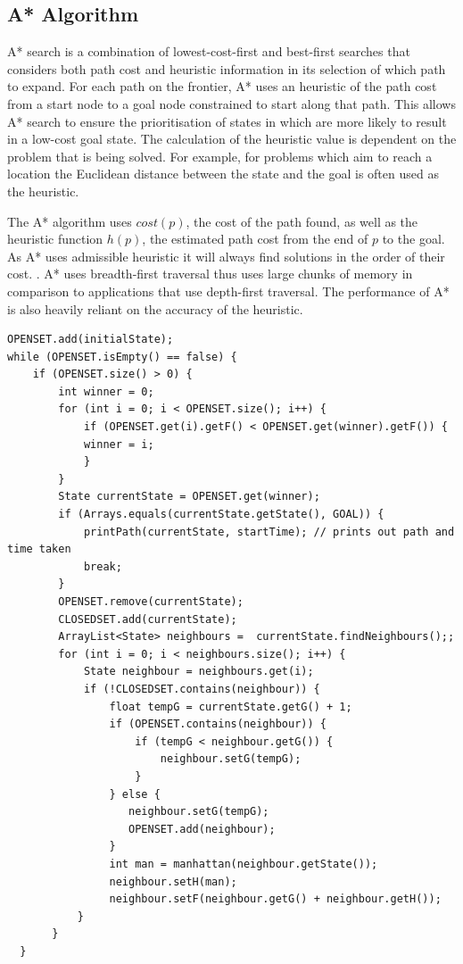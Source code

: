 \documentclass[progress]{cmpreport}
\begin{document}
\subsection{A* Algorithm}
A* search is a combination of lowest-cost-first and best-first searches that considers both path cost and heuristic information in its selection of which path to expand. For each path on the frontier, A* uses an heuristic of the path cost from a start node to a goal node constrained to start along that path. This allows A* search to ensure the prioritisation of states in which are more likely to result in a low-cost goal state. The calculation of the heuristic value is dependent on the problem that is being solved. For example, for problems which aim to reach a location the Euclidean distance between the state and the goal is often used as the heuristic. 

The A* algorithm uses $cost(p)$, the cost of the path found, as well as the heuristic function $h(p)$, the estimated path cost from the end of $p$ to the goal. As A* uses admissible heuristic it will always find solutions in the order of their cost. \citep{DBLP:journals/ker/Brewka96}.  A* uses breadth-first traversal thus uses large chunks of memory in comparison to applications that use depth-first traversal. The performance of A* is also heavily reliant on the accuracy of the heuristic.

\begin{verbatim}
OPENSET.add(initialState);
while (OPENSET.isEmpty() == false) {
    if (OPENSET.size() > 0) {
        int winner = 0;
        for (int i = 0; i < OPENSET.size(); i++) {
            if (OPENSET.get(i).getF() < OPENSET.get(winner).getF()) {
            winner = i;
            }
        }
        State currentState = OPENSET.get(winner);
        if (Arrays.equals(currentState.getState(), GOAL)) {
            printPath(currentState, startTime); // prints out path and time taken
            break;
        }
        OPENSET.remove(currentState);
        CLOSEDSET.add(currentState);
        ArrayList<State> neighbours =  currentState.findNeighbours();;
        for (int i = 0; i < neighbours.size(); i++) {
            State neighbour = neighbours.get(i);
            if (!CLOSEDSET.contains(neighbour)) {
                float tempG = currentState.getG() + 1;
                if (OPENSET.contains(neighbour)) {
                    if (tempG < neighbour.getG()) {
                        neighbour.setG(tempG);
                    }
                } else {
                   neighbour.setG(tempG);
                   OPENSET.add(neighbour);
                }
                int man = manhattan(neighbour.getState());
                neighbour.setH(man);
                neighbour.setF(neighbour.getG() + neighbour.getH());
           }
       }
  }
\end{verbatim}
\end{document}
